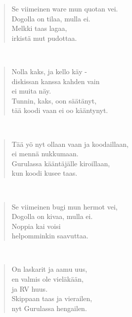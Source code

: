 \noindent\begin{minipage}{\linewidth}
\begin{verse}
	Se viimeinen ware mun quotan vei.\\
	Dogolla on tilaa, mulla ei.\\
	Melkki taas lagaa,\\
	irkistä mut pudottaa.\\
\end{verse}
\end{minipage}\\[10pt]
\noindent\begin{minipage}{\linewidth}
\begin{verse}
	Nolla kaks, ja kello käy -\\
	diskissan kanssa kahden vain\\
	ei muita näy.\\
	Tunnin, kaks, oon säätänyt,\\
	tää koodi vaan ei oo kääntynyt.\\
\end{verse}
\end{minipage}\\[10pt]
\noindent\begin{minipage}{\linewidth}
\begin{verse}
	Tää yö nyt ollaan vaan ja koodaillaan,\\
	ei mennä nukkumaan.\\
	Gurulassa kääntäjälle kiroillaan,\\
	kun koodi kusee taas.\\
\end{verse}
\end{minipage}\\[10pt]
\noindent\begin{minipage}{\linewidth}
\begin{verse}
	Se viimeinen bugi mun hermot vei,\\
	Dogolla on kivaa, mulla ei.\\
	Noppia kai voisi\\
	helpomminkin saavuttaa.\\
\end{verse}
\end{minipage}\\[10pt]
\noindent\begin{minipage}{\linewidth}
\begin{verse}
	On laskarit ja aamu uus,\\
	en valmis ole vieläkään,\\
	ja RV huus.\\
	Skippaan taas ja vierailen,\\
	nyt Gurulassa hengailen.\\
\end{verse}
\end{minipage}\\[10pt]

